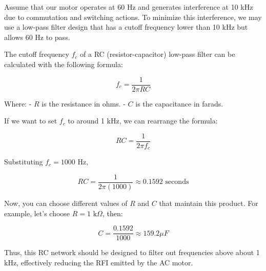 Assume that our motor operates at 60 Hz and generates interference at 10 kHz due to commutation and switching actions. To minimize this interference, we may use a low-pass filter design that has a cutoff frequency lower than 10 kHz but allows 60 Hz to pass.

The cutoff frequency \( f_c \) of a RC (resistor-capacitor) low-pass filter can be calculated with the following formula:

\[
f_c = \frac{1}{2\pi RC}
\]

Where:
- \( R \) is the resistance in ohms.
- \( C \) is the capacitance in farads.

If we want to set \( f_c \) to around 1 kHz, we can rearrange the formula:

\[
RC = \frac{1}{2\pi f_c}
\]

Substituting \( f_c = 1000 \) Hz,

\[
RC = \frac{1}{2\pi(1000)} \approx 0.1592 \text{ seconds}
\]

Now, you can choose different values of \( R \) and \( C \) that maintain this product. For example, let’s choose \( R = 1 \text{ k}\Omega \), then:

\[
C = \frac{0.1592}{1000} \approx 159.2 \mu F
\]

Thus, this RC network should be designed to filter out frequencies above about 1 kHz, effectively reducing the RFI emitted by the AC motor.




